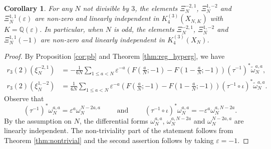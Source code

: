\documentclass[11pt,a4,leqno]{amsart}
\theoremstyle{my theoremstyle}
\newtheorem{cor}[thm]{Corollary}
\theoremstyle{dfn}
\theoremstyle{remark}
\renewcommand{\1}{\mathbbm{1}}
\newcommand{\Q}{\mathbb{Q}}
\newcommand{\e}{\varepsilon}
\numberwithin{equation}{section}
\begin{document}
\begin{cor}\label{cor:indep}
For any $N$ not divisible by $3$, the elements $\Xi_N^{-2,1}$, $\Xi_N^{1,-2}$ and $\Xi_N^{1,1}(\e)$ are non-zero and linearly independent in $K_4^{(3)}(X_{N, K})$ with $K=\Q(\e)$.
In particular, when $N$ is odd, the elements $\Xi_N^{-2,1}$, $\Xi_N^{1,-2}$ and $\Xi_N^{1,1}(-1)$ are non-zero and linearly independent in $K_4^{(3)}(X_N)$.
\end{cor}

\begin{proof}
By Proposition \ref{cor:pb} and Theorem \ref{thm:reg_hyperg}, we have
\begin{align*}
r_3(2)(\xi_N^{-2,1})&=-\frac1{6N} \sum_{1 \leq a < N} \e^{-a} \left(  F\left(\frac{a}N; -1\right) - F\left(1-\frac{a}N; -1\right) \right)(\tau^{-1})^*\widetilde{\omega}_N^{a, a}, \\
r_3(2)(\xi_N^{1,-2})&=\frac1{6N} \sum_{1 \leq a < N} \e^{-a} \left(  F\left(\frac{a}N; -1\right) - F\left(1-\frac{a}N; -1\right) \right)(\tau^{-1}\circ \iota)^*\widetilde{\omega}_N^{a, a}.   
\end{align*}
Observe that 
\begin{equation}\label{pull}
(\tau^{-1})^*\omega^{a,a}_N=\e^a \omega_N^{N-2a,a} \qquad \text{ and } \qquad (\tau^{-1}\circ \iota)^*\omega^{a,a}_N=-\e^a \omega_N^{a,N-2a}. 
\end{equation}
By the assumption on $N$, the differential forms $\omega_N^{a, a}$, $\omega_N^{a, N-2a}$ and $\omega_N^{N-2a, a}$ are linearly independent. The non-triviality part of the statement follows from Theorem \ref{thm:nontrivial} and the second assertion follows by taking $\e=-1$.   
\end{proof}
\end{document}

